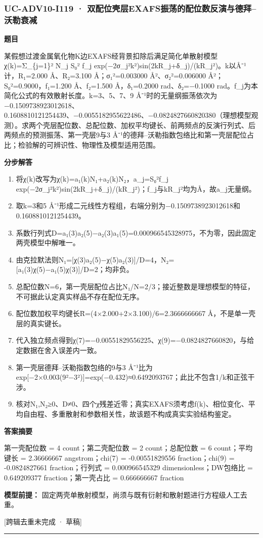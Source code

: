 \documentclass[UTF8,11pt,a4paper]{ctexart}
\begin{document}
\subsubsection*{UC-ADV10-I119 · 双配位壳层EXAFS振荡的配位数反演与德拜–沃勒衰减}
\noindent\textbf{题目}\par
某假想过渡金属氧化物K边EXAFS经背景扣除后满足简化单散射模型χ(k)=Σ\_\{j=1\}² N\_j S₀² f\_j exp(−2σ\_j²k²)sin(2kR\_j+δ\_j)/(kR\_j²)。k以Å⁻¹计，R₁=2.000 Å、R₂=3.100 Å；σ₁²=0.003000 Å²、σ₂²=0.006000 Å²；S₀²=0.9000，f₁=1.200 Å、f₂=1.500 Å，δ₁=0.2000 rad、δ₂=−0.1000 rad。f\_j为本简化公式的有效散射长度。k=3、5、7、9 Å⁻¹时的无量纲振荡依次为−0.1509738923012618、0.1608810121254439、−0.0055182955622486、−0.0824827660820380（理想模型观测）。求两个壳层配位数、总配位数、加权平均键长、前两频点的反演行列式、后两频点的预测振荡、第一壳层9与3 Å⁻¹的德拜–沃勒指数包络比和第一壳层配位占比；检验解的可辨识性、物理性及模型适用范围。\par
\medskip\noindent\textbf{分步解答}
\begin{enumerate}
\item 将χ(k)改写为χ(k)=a₁(k)N₁+a₂(k)N₂，a\_j=S₀²f\_j exp(−2σ\_j²k²)sin(2kR\_j+δ\_j)/(kR\_j²)；f\_j与kR\_j²均为Å，故a\_j无量纲。
\item 取k=3和5 Å⁻¹形成二元线性方程组，右端分别为−0.1509738923012618和0.1608810121254439。
\item 系数行列式D=a₁(3)a₂(5)−a₂(3)a₁(5)=0.000966545328975，不为零，因此固定两壳模型中解唯一。
\item 由克拉默法则N₁=[χ(3)a₂(5)−χ(5)a₂(3)]/D=4，N₂=[a₁(3)χ(5)−a₁(5)χ(3)]/D=2；均非负。
\item 总配位数N=6，第一壳层配位占比N₁/N=2/3；接近整数是理想模型的特征，不可据此认定真实样品不存在配位无序。
\item 配位数加权平均键长R̄=(4×2.000+2×3.100)/6=2.3666666667 Å，不是单一壳层的真实键长。
\item 代入独立频点得到χ(7)=−0.00551829556225、χ(9)=−0.0824827660820，与给定数据在舍入误差内一致。
\item 第一壳层德拜–沃勒指数包络的9与3 Å⁻¹比为exp[−2×0.003(9²−3²)]=exp(−0.432)≈0.6492093767；此比不包含1/k和正弦干涉。
\item 核对N₁,N₂≥0、D≠0、四个χ残差近零；真实EXAFS须考虑f(k)、相位变化、平均自由程、多重散射和参数相关性，故该题不构成真实实验结构鉴定。
\end{enumerate}
\noindent\textbf{答案摘要}\par
第一壳配位数 = 4 count；第二壳配位数 = 2 count；总配位数 = 6 count；平均键长 = 2.36666667 angstrom；chi(7) = -0.00551829556 fraction；chi(9) = -0.0824827661 fraction；行列式 = 0.000966545329 dimensionless；DW包络比 = 0.649209377 fraction；第一壳占比 = 0.666666667 fraction\par
\noindent\textbf{模型前提：}
固定两壳单散射模型，尚须与既有衍射和散射题进行方程级人工去重。\par
\noindent\textcolor{red!65!black}{[跨辑去重未完成 · 草稿]} \par
\medskip\hrule\medskip
{}
\end{document}
